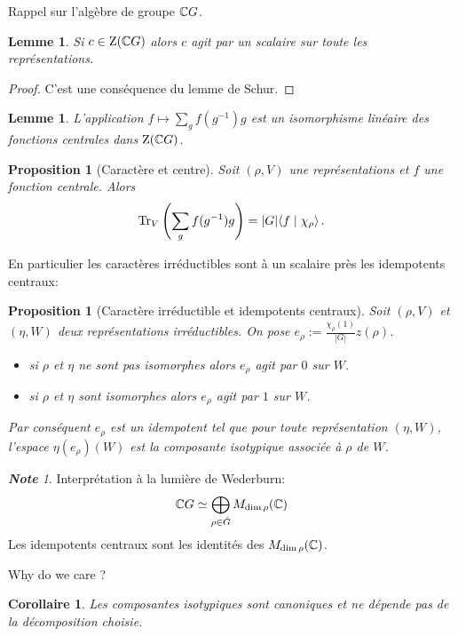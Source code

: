 \documentclass[francais,a4paper,11pt,reqno]{amsart}
\theoremstyle{plain}
\newtheorem{COR}[THEO]{\bf Corollaire}
\newtheorem{PROP}[THEO]{\bf Proposition}
\newtheorem{LEMME}[THEO]{\bf Lemme}
\theoremstyle{definition}
\theoremstyle{remark}
\newtheorem{NOTE}[THEO]{\bf Note}
\begin{document}
Rappel sur l'algèbre de groupe ${\mathbb C} G$.
\begin{LEMME}
  Si $c\in\operatorname{Z}({\mathbb C} G)$ alors $c$ agit par un scalaire sur toute les
  représentations.
\end{LEMME}
\begin{proof}
  C'est une conséquence du lemme de Schur.
\end{proof}

\begin{LEMME}
  L'application $f\mapsto \sum_g f(g^{-1})g$ est un isomorphisme linéaire
  des fonctions centrales dans $\operatorname{Z}({\mathbb C} G)$.
\end{LEMME}

\begin{PROP}[Caractère et centre]
  Soit $(\rho, V)$ une représentations et $f$ une fonction
  centrale. Alors
  \begin{equation}
    \operatorname{Tr}_V\left(\sum_g f(g^{-1})g\right) = |G|\langle f\mid\chi_\rho\rangle\,.
  \end{equation}
\end{PROP}
En particulier les caractères irréductibles sont à un scalaire près les
idempotents centraux:
\begin{PROP}[Caractère irréductible et idempotents centraux]
  Soit $(\rho, V)$ et $(\eta, W)$ deux représentations irréductibles.  On pose
  $e_\rho := \frac{\chi_\rho(1)}{|G|} z(\rho)$.
  \begin{itemize}
  \item si $\rho$ et $\eta$ ne sont pas isomorphes alors $e_\rho$ agit par $0$
    sur $W$.
  \item si $\rho$ et $\eta$ sont isomorphes alors $e_\rho$ agit par $1$ sur $W$.
  \end{itemize}
  Par conséquent $e_\rho$ est un idempotent tel que pour toute représentation
  $(\eta,W)$, l'espace $\eta(e_\rho)(W)$ est la composante isotypique associée
  à $\rho$ de $W$.
\end{PROP}
\begin{NOTE}
  Interprétation à la lumière de Wederburn:
  \begin{equation}
    {\mathbb C} G \simeq \bigoplus_{\rho\in\hat{G}} M_{\dim \rho}({\mathbb C})
  \end{equation}
  Les idempotents centraux sont les identités des $M_{\dim \rho}({\mathbb C})$.
\end{NOTE}
Why do we care ?
\begin{COR}
  Les composantes isotypiques sont canoniques et ne dépende pas de la
  décomposition choisie.
\end{COR}
\end{document}
